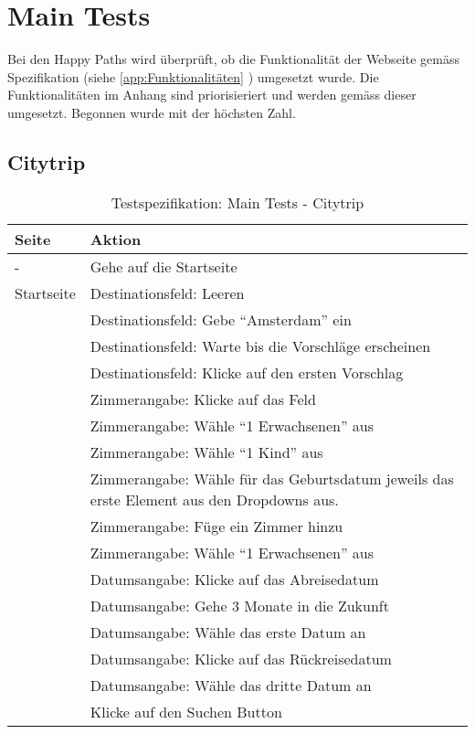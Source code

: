 \section{Main Tests}
Bei den Happy Paths wird überprüft, ob die Funktionalität der Webseite gemäss Spezifikation (siehe \cref{app:Funktionalitäten} ) umgesetzt wurde. Die Funktionalitäten im Anhang sind priorisieriert und werden gemäss dieser umgesetzt. Begonnen wurde mit der höchsten Zahl.

\subsection{Citytrip}

\begin{table}[H] 
	\caption{Testspezifikation: Main Tests - Citytrip}
	\centering
		
	\begin{tabularx}{0.9\textwidth}{ | l | X | } 
		\hline 
		\textbf{Seite} & \textbf{Aktion} \\ \hline 
		\multirow{1}{*}{-} & Gehe auf die Startseite \\ \hline
		\multirow{1}{*}{Startseite} & Destinationsfeld: Leeren \\ \cline{2-2}
		& Destinationsfeld: Gebe "`Amsterdam"' ein \\ \cline{2-2}
		& Destinationsfeld: Warte bis die Vorschläge erscheinen \\ \cline{2-2}
		& Destinationsfeld: Klicke auf den ersten Vorschlag \\ \cline{2-2}
		& Zimmerangabe: Klicke auf das Feld \\ \cline{2-2}
		& Zimmerangabe: Wähle "`1 Erwachsenen"' aus \\ \cline{2-2}
		& Zimmerangabe: Wähle "`1 Kind"' aus \\ \cline{2-2}
		& Zimmerangabe: Wähle für das Geburtsdatum jeweils das erste Element aus den Dropdowns aus.  \\ \cline{2-2}
		& Zimmerangabe: Füge ein Zimmer hinzu \\ \cline{2-2}
		& Zimmerangabe: Wähle "`1 Erwachsenen"' aus \\ \cline{2-2}
		& Datumsangabe: Klicke auf das Abreisedatum \\ \cline{2-2}
		& Datumsangabe: Gehe 3 Monate in die Zukunft \\ \cline{2-2}
		& Datumsangabe: Wähle das erste Datum an \\ \cline{2-2}
		& Datumsangabe: Klicke auf das Rückreisedatum \\ \cline{2-2}
		& Datumsangabe: Wähle das dritte Datum an \\ \cline{2-2}
		& Klicke auf den Suchen Button \\ \hline
		

\end{tabularx}
\end{table}
